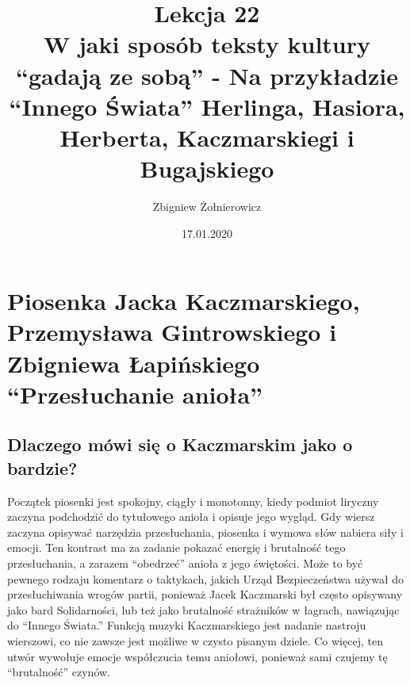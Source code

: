 \documentclass[a4paper]{article}
\begin{document}
\title{{\huge Lekcja 22} \\
{\large W jaki sposób teksty kultury ``gadają ze sobą'' - Na przykładzie ``Innego Świata'' Herlinga, Hasiora, Herberta, Kaczmarskiegi i Bugajskiego}}
\author{Zbigniew Żołnierowicz}
\date{17.01.2020}
\maketitle
\section{Piosenka Jacka Kaczmarskiego, Przemysława Gintrowskiego i Zbigniewa Łapińskiego ``Prze\-słuchanie anioła''}
\subsection{Dlaczego mówi się o Kaczmarskim jako o bardzie?}
Początek piosenki jest spokojny, ciągły i monotonny, kiedy podmiot liryczny zaczyna podchodzić do tytułowego anioła i opisuje jego wygląd.
Gdy wiersz zaczyna opisywać narzędzia przesłuchania, piosenka i wymowa słów nabiera siły i emocji.
Ten kontrast ma za zadanie pokazać energię i brutalność tego przesłuchania, a zarazem ``obedrzeć'' anioła z jego świętości.
Może to być pewnego rodzaju komentarz o taktykach, jakich Urząd Bezpieczeństwa używał do przesłuchiwania wrogów partii, ponieważ Jacek Kaczmarski był często opisywany jako bard Solidarności, lub też jako brutalność strażników w łagrach, nawiązując do ``Innego Świata.''
Funkcją muzyki Kaczmarskiego jest nadanie nastroju wierszowi, co nie zawsze jest możliwe w czysto pisanym dziele. Co więcej, ten utwór wywołuje emocje współczucia temu aniołowi, ponieważ sami czujemy tę ``brutalność'' czynów.
\end{document}

